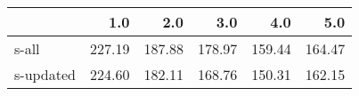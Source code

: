 \begin{tabular}{lrrrrr}
\toprule
{} &    1.0 &    2.0 &    3.0 &    4.0 &    5.0 \\
\midrule
s-all     & 227.19 & 187.88 & 178.97 & 159.44 & 164.47 \\
s-updated & 224.60 & 182.11 & 168.76 & 150.31 & 162.15 \\
\bottomrule
\end{tabular}
